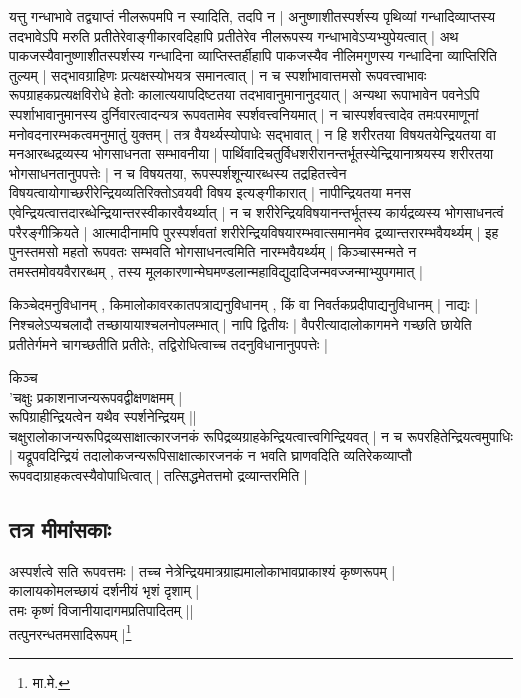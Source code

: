 यत्तु गन्धाभावे तद्व्याप्तं नीलरूपमपि न स्यादिति, तदपि न | अनुष्णाशीतस्पर्शस्य पृथिव्यां गन्धादिव्याप्तस्य तदभावेऽपि मरुति प्रतीतेरेवाङ्गीकारवदिहापि प्रतीतेरेव नीलरूपस्य गन्धाभावेऽप्यभ्युपेयत्वात् | अथ पाकजस्यैवानुष्णाशीतस्पर्शस्य गन्धादिना व्याप्तिस्तर्हीहापि पाकजस्यैव नीलिमगुणस्य गन्धादिना व्याप्तिरिति तुल्यम् | सद्भावग्राहिणः प्रत्यक्षस्योभयत्र समानत्वात् | न च स्पर्शाभावात्तमसो रूपवत्त्वाभावः रूपग्राहकप्रत्यक्षविरोधे हेतोः कालात्ययापदिष्टतया तदभावानुमानानुदयात् | अन्यथा रूपाभावेन पवनेऽपि स्पर्शाभावानुमानस्य दुर्निवारत्वादन्यत्र रूपवतामेव स्पर्शवत्त्वनियमात् | न चास्पर्शवत्त्वादेव तमःपरमाणूनां मनोवदनारम्भकत्वमनुमातुं युक्तम् | तत्र वैयर्थ्यस्योपाधेः सद्भावात् | न हि शरीरतया विषयतयेन्द्रियतया वा मनआरब्धद्रव्यस्य भोगसाधनता सम्भावनीया | पार्थिवादिचतुर्विधशरीरानन्तर्भूतस्येन्द्रियानाश्रयस्य शरीरतया भोगसाधनतानुपपत्तेः | न च विषयतया, रूपस्पर्शशून्यारब्धस्य  तद्रहितत्त्वेन विषयत्वायोगाच्छरीरेन्द्रियव्यतिरिक्तोऽवयवी विषय इत्यङ्गीकारात् | नापीन्द्रियतया मनस एवेन्द्रियत्वात्तदारब्धेन्द्रियान्तरस्वीकारवैयर्थ्यात् | न च शरीरेन्द्रियविषयानन्तर्भूतस्य कार्यद्रव्यस्य भोगसाधनत्वं परैरङ्गीक्रियते | आत्मादीनामपि पुरस्पर्शवतां शरीरेन्द्रियविषयारम्भवात्समानमेव द्रव्यान्तरारम्भवैयर्थ्यम् | इह पुनस्तमसो महतो रूपवतः सम्भवति भोगसाधनत्वमिति नारम्भवैयर्थ्यम् | किञ्चास्मन्मते न तमस्तमोवयवैरारब्धम् , तस्य मूलकारणान्मेघमण्डलान्महाविद्युदादिजन्मवज्जन्माभ्युपगमात् |

किञ्चेदमनुविधानम् , किमालोकावरकातपत्राद्यनुविधानम् , किं वा निवर्तकप्रदीपाद्यनुविधानम् | नाद्यः | निश्चलेऽप्यचलादौ तच्छायायाश्चलनोपलम्भात् | नापि द्वितीयः | वैपरीत्यादालोकागमने गच्छति छायेति प्रतीतेर्गमने चागच्छतीति प्रतीतेः, तद्विरोधित्वाच्च तदनुविधानानुपपत्तेः | 

किञ्च\\ 'चक्षुः प्रकाशनाजन्यरूपवद्वीक्षणक्षमम् |\\[-3mm] रूपिग्राहीन्द्रियत्वेन यथैव स्पर्शनेन्द्रियम् ||\\ चक्षुरालोकाजन्यरूपिद्रव्यसाक्षात्कारजनकं रूपिद्रव्यग्राहकेन्द्रियत्वात्त्वगिन्द्रियवत् | न च रूपरहितेन्द्रियत्वमुपाधिः | यद्रूपवदिन्द्रियं तदालोकजन्यरूपिसाक्षात्कारजनकं न भवति घ्राणवदिति व्यतिरेकव्याप्तौ रूपवदाग्राहकत्वस्यैवोपाधित्वात् | तत्सिद्धमेतत्तमो द्रव्यान्तरमिति |

\subsection{तत्र मीमांसकाः} अस्पर्शत्वे सति रूपवत्तमः | तच्च नेत्रेन्द्रियमात्रग्राह्यमालोकाभावप्राकाश्यं कृष्णरूपम् |\\ कालायकोमलच्छायं दर्शनीयं भृशं दृशाम् |\\ तमः कृष्णं विजानीयादागमप्रतिपादितम् ||\\ तत्पुनरन्धतमसादिरूपम् |\footnote{मा.मे.}
